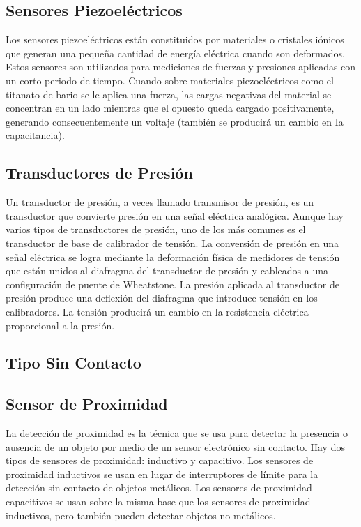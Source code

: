 \subsection*{\quad\textbf{Sensores Piezoeléctricos}}
Los sensores piezoeléctricos están constituidos por materiales o cristales iónicos que generan una pequeña cantidad de energía eléctrica cuando son deformados. Estos sensores son utilizados para mediciones de fuerzas y presiones aplicadas con un corto periodo de tiempo.
Cuando sobre materiales piezoeléctricos como el titanato de bario se le aplica una fuerza, las cargas negativas del material se concentran en un lado mientras que el opuesto queda cargado positivamente, generando consecuentemente un voltaje (también se producirá un cambio en Ia capacitancia).

\subsection*{\quad\textbf{Transductores de Presión}}
Un transductor de presión, a veces llamado transmisor de presión, es un transductor que convierte presión en una señal eléctrica analógica. Aunque hay varios tipos de transductores de presión, uno de los más comunes es el transductor de base de calibrador de tensión. La conversión de presión en una señal eléctrica se logra mediante la deformación física de medidores de tensión que están unidos al diafragma del transductor de presión y cableados a una configuración de puente de Wheatstone. La presión aplicada al transductor de presión produce una deflexión del diafragma que introduce tensión en los calibradores. La tensión producirá un cambio en la resistencia eléctrica proporcional a la presión. \cite{OmegaPressureTransducers}

\subsection{Tipo Sin Contacto}

\subsection*{\quad\textbf{Sensor de Proximidad}}
La detección de proximidad es la técnica que se usa para detectar la presencia o ausencia de un objeto por medio de un sensor electrónico sin contacto. Hay dos tipos de sensores de proximidad: inductivo y capacitivo. Los sensores de proximidad inductivos se usan en lugar de interruptores de límite para la detección sin contacto de objetos metálicos. Los sensores de proximidad capacitivos se usan sobre la misma base que los sensores de proximidad inductivos, pero también pueden detectar objetos no metálicos.



\pagebreak
